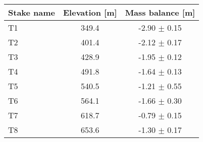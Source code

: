 \begin{tabular}{lcc}
\toprule
Stake name & Elevation [m] &  Mass balance [m] \\
\midrule
        T1 &         349.4 &  -2.90 $\pm$ 0.15 \\
        T2 &         401.4 &  -2.12 $\pm$ 0.17 \\
        T3 &         428.9 &  -1.95 $\pm$ 0.12 \\
        T4 &         491.8 &  -1.64 $\pm$ 0.13 \\
        T5 &         540.5 &  -1.21 $\pm$ 0.55 \\
        T6 &         564.1 &  -1.66 $\pm$ 0.30 \\
        T7 &         618.7 &  -0.79 $\pm$ 0.15 \\
        T8 &         653.6 &  -1.30 $\pm$ 0.17 \\
\bottomrule
\end{tabular}
